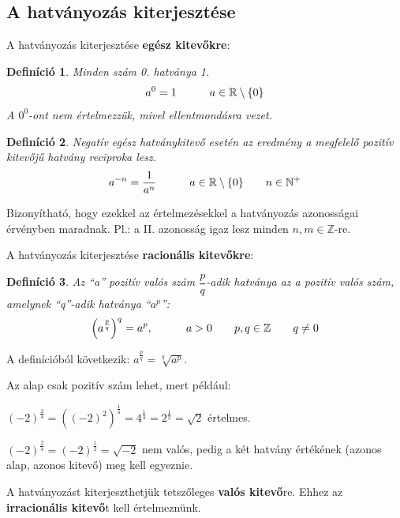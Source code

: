 \documentclass[12pt,a4paper]{article}
\newtheorem{definition}{Definíció} [section]
\begin{document}
\subsection{A hatványozás kiterjesztése}
A hatványozás kiterjesztése \textbf{egész kitevőkre}:
\begin{definition}
Minden szám 0. hatványa 1. \\
$$a^0 = 1 \hspace{30px} a \in \mathbb{R}\setminus \lbrace 0\rbrace$$
A $0^0$-ont nem értelmezzük, mivel ellentmondásra vezet. 
\end{definition}

\begin{definition}
Negatív egész hatványkitevő esetén az eredmény a megfelelő pozitív kitevőjű hatvány reciproka lesz. \\
$$a^{-n} = \dfrac{1}{a^n} \hspace{30px} a \in \mathbb{R}\setminus \lbrace 0\rbrace \hspace{20px} n \in \mathbb{N}^+ $$
\end{definition}


Bizonyítható, hogy ezekkel az értelmezésekkel a hatványozás azonosságai érvényben maradnak.
Pl.: a II. azonosság igaz lesz minden $n,m\in \mathbb{Z}$-re.

\vspace{50px}
A hatványozás kiterjesztése \textbf{racionális kitevőkre}:
\begin{definition}
Az ``a'' pozitív valós szám $\dfrac{p}{q}$-adik hatványa az a pozitív valós szám, amelynek ``q''-adik hatványa ``$a^p$'':
$$\left(a^{\frac{p}{q}}\right)^q=a^p, \hspace{30px}a>0\hspace{20px} p,q\in \mathbb{Z} \hspace{20px}q\neq 0$$
\end{definition}
A definícióból következik: $a^{\frac{p}{q}}=\sqrt[q]{a^p}$.

Az alap csak pozitív szám lehet, mert például:

$(-2)^\frac{2}{4}=((-2)^2)^\frac{1}{4}=4^\frac{1}{4}=2^\frac{1}{2}=\sqrt{2}$ értelmes.

$(-2)^\frac{2}{4}=(-2)^\frac{1}{2}=\sqrt{-2}$ nem valós, pedig a két hatvány értékének (azonos alap, azonos
kitevő) meg kell egyeznie.
\vspace{20px}

A hatványozást kiterjeszthetjük tetszőleges \textbf{valós kitevő}re. Ehhez az \textbf{irracionális kitevő}t kell értelmeznünk.
\end{document}
